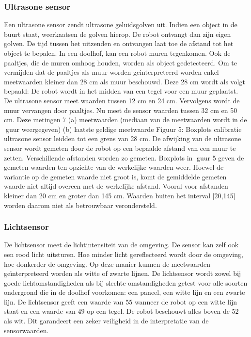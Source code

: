 \documentclass[tt3]{penoverslag}
\begin{document}
\subsubsection{Ultrasone sensor}
Een ultrasone sensor zendt ultrasone geluidsgolven uit. Indien een object in de buurt staat, weerkaatsen de golven hierop. De robot ontvangt dan zijn eigen golven. De tijd tussen het uitzenden en ontvangen laat toe de afstand tot het object te bepalen. In een doolhof, kan een robot muren tegenkomen. Ook de paaltjes, die de muren omhoog houden, worden als object gedetecteerd. Om te vermijden dat de paaltjes als muur worden geinterpreteerd worden enkel meetwaarden kleiner dan 28 cm als muur beschouwd. Deze 28 cm wordt als volgt bepaald: De robot wordt in het midden van een tegel voor een muur geplaatst. De ultrasone sensor meet waarden tussen 12 cm en 24 cm. Vervolgens wordt de muur vervangen door paaltjes. Nu meet de sensor waarden tussen 32 cm en 50 cm. Deze metingen 7 (a) meetwaarden (mediaan van de meetwaarden wordt in de guur weergegeven) (b) laatste geldige meetwaarde Figuur 5: Boxplots calibratie ultrasone sensor leidden tot een grens van 28 cm. De afwijking van de ultrasone sensor wordt gemeten door de robot op een bepaalde afstand van een muur te zetten. Verschillende afstanden worden zo gemeten. Boxplots in guur 5 geven de
gemeten waarden ten opzichte van de werkelijke waarden weer. Hoewel de variantie op de gemeten waarde niet groot is, komt de gemiddelde gemeten waarde niet altijd overeen met de werkelijke afstand. Vooral voor afstanden kleiner dan 20 cm en groter dan 145 cm. Waarden buiten het interval [20,145] worden daarom niet als betrouwbaar verondersteld.


\subsubsection{Lichtsensor}
De lichtsensor meet de lichtintensiteit van de omgeving. De sensor kan zelf ook een rood licht uitsturen. Hoe minder licht gereflecteerd wordt door de omgeving, hoe donkerder de omgeving. Op deze manier kunnen de meetwaarden ge\"interpreteerd worden als witte of zwarte lijnen.
De lichtsensor wordt zowel bij goede lichtomstandigheden als bij slechte omstandigheden getest voor alle soorten ondergrond die in de doolhof voorkomen: een paneel, een witte lijn en een zwarte lijn.
De lichtsensor geeft een waarde van $55$ wanneer de robot op een witte lijn staat en een waarde van $49$ op een tegel. De robot beschouwt alles boven de $52$ als wit. Dit garandeert een zeker veiligheid in de interpretatie van de sensorwaarden.
\end{document}
